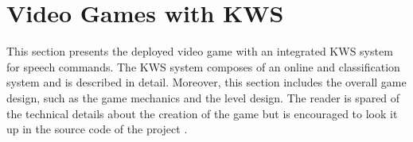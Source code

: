 
\chapter{Video Games with KWS}\label{sec:game}
This section presents the deployed video game with an integrated KWS system for speech commands.
The KWS system composes of an online and classification system and is described in detail.
Moreover, this section includes the overall game design, such as the game mechanics and the level design.
The reader is spared of the technical details about the creation of the game but is encouraged to look it up in the source code of the project \cite{KWSGame}.



